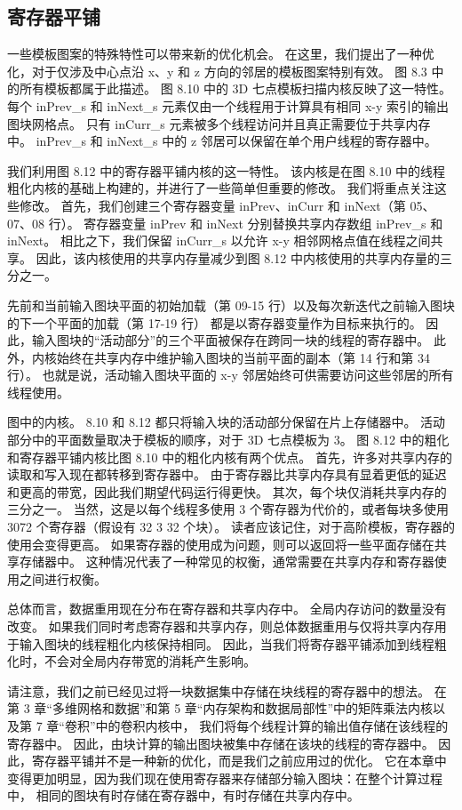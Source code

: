 \subsection{寄存器平铺}
一些模板图案的特殊特性可以带来新的优化机会。 
在这里，我们提出了一种优化，对于仅涉及中心点沿 x、y 和 z 方向的邻居的模板图案特别有效。 
图 8.3 中的所有模板都属于此描述。 图 8.10 中的 3D 七点模板扫描内核反映了这一特性。 
每个 inPrev\_s 和 inNext\_s 元素仅由一个线程用于计算具有相同 x-y 索引的输出图块网格点。 
只有 inCurr\_s 元素被多个线程访问并且真正需要位于共享内存中。 
inPrev\_s 和 inNext\_s 中的 z 邻居可以保留在单个用户线程的寄存器中。

我们利用图 8.12 中的寄存器平铺内核的这一特性。 
该内核是在图 8.10 中的线程粗化内核的基础上构建的，并进行了一些简单但重要的修改。 我们将重点关注这些修改。 
首先，我们创建三个寄存器变量 inPrev、inCurr 和 inNext（第 05、07、08 行）。 
寄存器变量 inPrev 和 inNext 分别替换共享内存数组 inPrev\_s 和 inNext。 
相比之下，我们保留 inCurr\_s 以允许 x-y 相邻网格点值在线程之间共享。 
因此，该内核使用的共享内存量减少到图 8.12 中内核使用的共享内存量的三分之一。

先前和当前输入图块平面的初始加载（第 09-15 行）以及每次新迭代之前输入图块的下一个平面的加载（第 17-19 行）
都是以寄存器变量作为目标来执行的。 因此，输入图块的“活动部分”的三个平面被保存在跨同一块的线程的寄存器中。 
此外，内核始终在共享内存中维护输入图块的当前平面的副本（第 14 行和第 34 行）。 
也就是说，活动输入图块平面的 x-y 邻居始终可供需要访问这些邻居的所有线程使用。

图中的内核。 8.10 和 8.12 都只将输入块的活动部分保留在片上存储器中。 
活动部分中的平面数量取决于模板的顺序，对于 3D 七点模板为 3。 
图 8.12 中的粗化和寄存器平铺内核比图 8.10 中的粗化内核有两个优点。 首先，许多对共享内存的读取和写入现在都转移到寄存器中。 
由于寄存器比共享内存具有显着更低的延迟和更高的带宽，因此我们期望代码运行得更快。 其次，每个块仅消耗共享内存的三分之一。 
当然，这是以每个线程多使用 3 个寄存器为代价的，或者每块多使用 3072 个寄存器（假设有 32 3 32 个块）。 
读者应该记住，对于高阶模板，寄存器的使用会变得更高。 如果寄存器的使用成为问题，则可以返回将一些平面存储在共享存储器中。 
这种情况代表了一种常见的权衡，通常需要在共享内存和寄存器使用之间进行权衡。

总体而言，数据重用现在分布在寄存器和共享内存中。 全局内存访问的数量没有改变。 
如果我们同时考虑寄存器和共享内存，则总体数据重用与仅将共享内存用于输入图块的线程粗化内核保持相同。 
因此，当我们将寄存器平铺添加到线程粗化时，不会对全局内存带宽的消耗产生影响。

请注意，我们之前已经见过将一块数据集中存储在块线程的寄存器中的想法。 
在第 3 章“多维网格和数据”和第 5 章“内存架构和数据局部性”中的矩阵乘法内核以及第 7 章“卷积”中的卷积内核中，
我们将每个线程计算的输出值存储在该线程的寄存器中。 因此，由块计算的输出图块被集中存储在该块的线程的寄存器中。 
因此，寄存器平铺并不是一种新的优化，而是我们之前应用过的优化。 
它在本章中变得更加明显，因为我们现在使用寄存器来存储部分输入图块：在整个计算过程中，
相同的图块有时存储在寄存器中，有时存储在共享内存中。

